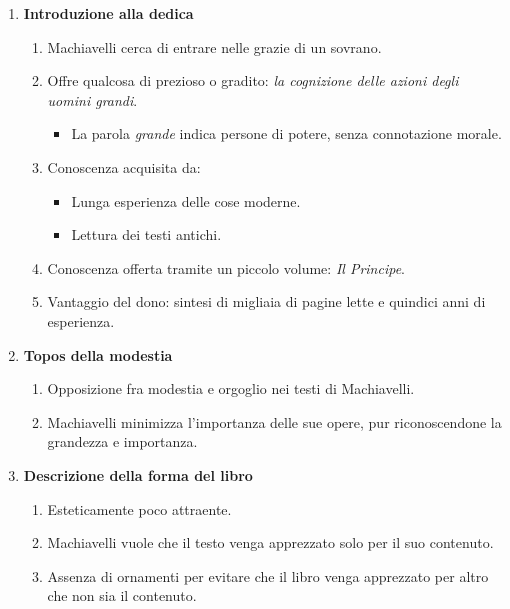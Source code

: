 \documentclass{article}
\begin{document}
\begin{enumerate}
    \item \textbf{Introduzione alla dedica}
    \begin{enumerate}[label*=\arabic*.]
        \item Machiavelli cerca di entrare nelle grazie di un sovrano.
        \item Offre qualcosa di prezioso o gradito: \textit{la cognizione delle azioni degli uomini grandi}.
        \begin{itemize}
            \item La parola \textit{grande} indica persone di potere, senza connotazione morale.
        \end{itemize}
        \item Conoscenza acquisita da:
        \begin{itemize}
            \item Lunga esperienza delle cose moderne.
            \item Lettura dei testi antichi.
        \end{itemize}
        \item Conoscenza offerta tramite un piccolo volume: \textit{Il Principe}.
        \item Vantaggio del dono: sintesi di migliaia di pagine lette e quindici anni di esperienza.
    \end{enumerate}

    \item \textbf{Topos della modestia}
    \begin{enumerate}[label*=\arabic*.]
        \item Opposizione fra modestia e orgoglio nei testi di Machiavelli.
        \item Machiavelli minimizza l'importanza delle sue opere, pur riconoscendone la grandezza e importanza.
    \end{enumerate}

    \item \textbf{Descrizione della forma del libro}
    \begin{enumerate}[label*=\arabic*.]
        \item Esteticamente poco attraente.
        \item Machiavelli vuole che il testo venga apprezzato solo per il suo contenuto.
        \item Assenza di ornamenti per evitare che il libro venga apprezzato per altro che non sia il contenuto.
    \end{enumerate}


\end{enumerate}
\end{document}
